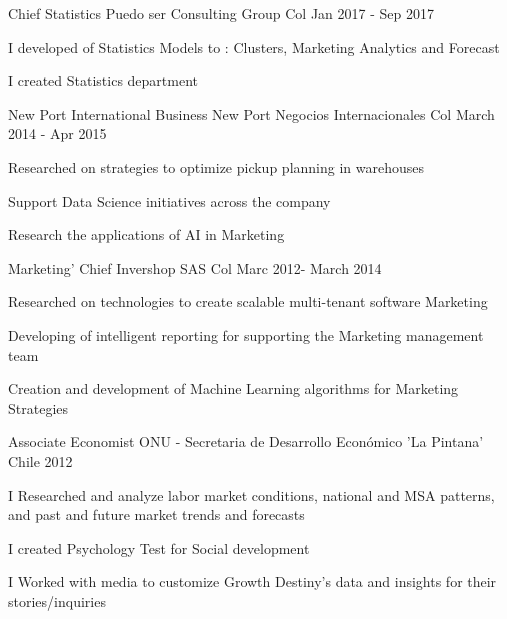 \begin{cventries}
    \cventry
    {Chief Statistics}%
    {Puedo ser Consulting Group} %
    {Col} %
    {Jan 2017 - Sep 2017} %
    {
    \begin{cvitems} 
    \item {I developed of Statistics Models to : Clusters, Marketing Analytics and Forecast}
    \item {I created Statistics department }
       \end{cvitems}
    }
    

    \cventry
    {New Port International Business }%
    {New Port Negocios Internacionales} %
    {Col} %
    {March 2014 - Apr 2015} %
    {
    \begin{cvitems} 
    \item {Researched on strategies to optimize pickup planning in warehouses}
    \item {Support Data Science initiatives across the company}
    \item {Research the applications of AI in Marketing}
       \end{cvitems}
    }
    

    \cventry
    {Marketing' Chief}%
    {Invershop SAS} %
    {Col} %
    {Marc 2012- March 2014} %
    {
    \begin{cvitems} 
     \item { Researched on technologies to create scalable multi-tenant
software Marketing}
      \item {Developing of intelligent reporting for supporting the Marketing management team}
       \item {Creation and development of Machine Learning algorithms for Marketing Strategies }
       \end{cvitems}
    }

    \cventry
    {Associate Economist}%
    {ONU - Secretaria de Desarrollo Económico 'La Pintana'} %
    {Chile} %
    {2012} %
    {
    \begin{cvitems} 
    \item { I Researched and analyze labor market conditions, national and MSA patterns, and past and future market trends and forecasts}
    \item {I created Psychology Test for Social development }
    \item {I Worked with media to customize Growth Destiny’s data and insights for their stories/inquiries}
    \end{cvitems}
    }

\end{cventries}
